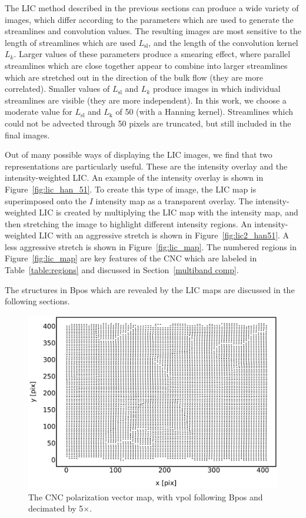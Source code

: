 The LIC method described in the previous sections can produce a wide variety of images, which differ according to the parameters which are used to generate the streamlines and convolution values. The resulting images are most sensitive to the length of streamlines which are used $L_{\mathrm{sl}}$, and the length of the convolution kernel $L_{k}$. Larger values of these parameters produce a smearing effect, where parallel streamlines which are close together appear to combine into larger streamlines which are stretched out in the direction of the bulk flow (they are more correlated). Smaller values of $L_{\mathrm{sl}}$ and $L_{k}$ produce images in which individual streamlines are visible (they are more independent). In this work, we choose a moderate value for $L_{\mathrm{sl}}$ and $L_{\mathrm{k}}$ of 50 (with a Hanning kernel). Streamlines which could not be advected through 50 pixels are truncated, but still included in the final images.

Out of many possible ways of displaying the LIC images, we find that two representations are particularly useful. These are the intensity overlay and the intensity-weighted LIC\@. An example of the intensity overlay is shown in Figure~\ref{fig:lic_han_51}. To create this type of image, the LIC map is superimposed onto the $I$ intensity map as a transparent overlay. The intensity-weighted LIC is created by multiplying the LIC map with the intensity map, and then stretching the image to highlight different intensity regions. An intensity-weighted LIC with an aggressive stretch is shown in Figure~\ref{fig:lic2_han51}. A less aggressive stretch is shown in Figure~\ref{fig:lic_map}. The numbered regions in Figure~\ref{fig:lic_map} are key features of the CNC which are labeled in Table~\ref{table:regions} and discussed in Section~\ref{multiband comp}.

The structures in \gls{Bpos} which are revealed by the LIC maps are discussed in the following sections.

\begin{figure}[!htbp]
\centering
\includegraphics[width=\textwidth]{figures/carina/vectors_5}
\caption[The CNC polarization vector map, decimated by 5\macrocapwrap{$\times$}.]{The CNC polarization vector map, with \gls{vpol} following \gls{Bpos} and decimated by 5$\times$.}
\label{fig:vectors_5}
\end{figure}

